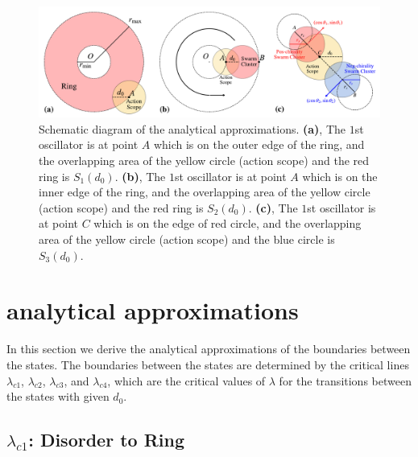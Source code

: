 \documentclass[%
 aip,
 amsmath,amssymb,
 reprint,%
]{revtex4-1}
\begin{document}
\begin{figure}
    \includegraphics[width=\textwidth]{./figs/analyticalEps.pdf}
    \caption{
        \label{fig:analyticalEps}
        Schematic diagram of the analytical approximations.
        \textbf{(a)}, The $1$st oscillator is at point $A$ which is on the outer edge of the ring, and the overlapping area of the yellow circle (action scope) and the red ring is $S_1\left( d_0 \right)$.
        \textbf{(b)}, The $1$st oscillator is at point $A$ which is on the inner edge of the ring, and the overlapping area of the yellow circle (action scope) and the red ring is $S_2\left( d_0 \right)$.
        \textbf{(c)}, The $1$st oscillator is at point $C$ which is on the edge of red circle, and the overlapping area of the yellow circle (action scope) and the blue circle is $S_3\left( d_0 \right)$.
    }
\end{figure}

\section{\label{analytical} analytical approximations}

In this section we derive the analytical approximations of the boundaries between the states. 
The boundaries between the states are determined by the critical lines $\lambda_{c1}$, $\lambda_{c2}$, $\lambda_{c3}$, and $\lambda_{c4}$, which are the critical values of $\lambda$ for the transitions between the states with given $d_0$.

\subsection{$\lambda_{c1}$: Disorder to Ring}
\end{document}
